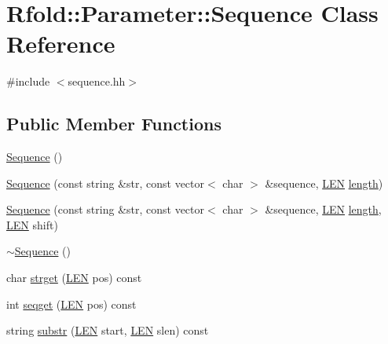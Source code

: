 \hypertarget{class_rfold_1_1_parameter_1_1_sequence}{\section{Rfold\+:\+:Parameter\+:\+:Sequence Class Reference}
\label{class_rfold_1_1_parameter_1_1_sequence}
}


{\ttfamily \#include $<$sequence.\+hh$>$}

\subsection*{Public Member Functions}
\begin{DoxyCompactItemize}
\item 
\hyperlink{class_rfold_1_1_parameter_1_1_sequence_ab2aad5252c57fc410a8bd122cb5a0f0e}{Sequence} ()
\item 
\hyperlink{class_rfold_1_1_parameter_1_1_sequence_a9b7d40f144e63aeff7834c081661b238}{Sequence} (const string \&str, const vector$<$ char $>$ \&sequence, \hyperlink{energy__const_8hh_a05b49c662c073f89e86804f7856622a0}{L\+E\+N} \hyperlink{class_rfold_1_1_parameter_1_1_sequence_aa9e3bfb9862ce32ecc4ab2260e4dd40c}{length})
\item 
\hyperlink{class_rfold_1_1_parameter_1_1_sequence_a7505d8d474a76a8d57da433c38e4fb9d}{Sequence} (const string \&str, const vector$<$ char $>$ \&sequence, \hyperlink{energy__const_8hh_a05b49c662c073f89e86804f7856622a0}{L\+E\+N} \hyperlink{class_rfold_1_1_parameter_1_1_sequence_aa9e3bfb9862ce32ecc4ab2260e4dd40c}{length}, \hyperlink{energy__const_8hh_a05b49c662c073f89e86804f7856622a0}{L\+E\+N} shift)
\item 
\hyperlink{class_rfold_1_1_parameter_1_1_sequence_a4904474a30a4685879ecc795b1f74d61}{$\sim$\+Sequence} ()
\item 
char \hyperlink{class_rfold_1_1_parameter_1_1_sequence_a7e3a790783f67e1cbaa03effe703625b}{strget} (\hyperlink{energy__const_8hh_a05b49c662c073f89e86804f7856622a0}{L\+E\+N} pos) const 
\item 
int \hyperlink{class_rfold_1_1_parameter_1_1_sequence_ad26e4745cd7593d335a0c06dfee1d250}{seqget} (\hyperlink{energy__const_8hh_a05b49c662c073f89e86804f7856622a0}{L\+E\+N} pos) const 
\item 
string \hyperlink{class_rfold_1_1_parameter_1_1_sequence_af90f7c6f47b6e0bf186116d73be8df76}{substr} (\hyperlink{energy__const_8hh_a05b49c662c073f89e86804f7856622a0}{L\+E\+N} start, \hyperlink{energy__const_8hh_a05b49c662c073f89e86804f7856622a0}{L\+E\+N} slen) const 

\end{DoxyCompactItemize}
